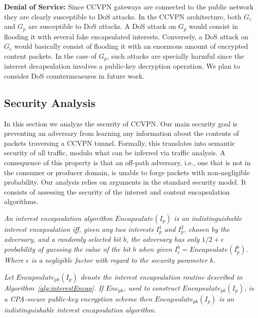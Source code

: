 \textbf{Denial of Service:} Since CCVPN gateways are connected to the public network they are clearly susceptible to DoS attacks. In the CCVPN architecture, both $G_c$ and $G_p$ are susceptible to DoS attacks. A DoS attack on $G_p$ would consist in flooding it with several fake encapsulated interests. Conversely, a DoS attack on $G_c$ would basically consist of flooding it with an enormous amount of encrypted content packets. In the case of $G_p$, such attacks are specially harmful since the interest decapsulation involves a public-key decryption operation. We plan to consider DoS countermeasures in future work.

\subsection{Security Analysis}

In this section we analyze the security of CCVPN. Our main security goal is
preventing an adversary from learning any information about the contents of
packets traversing a CCVPN tunnel. Formally, this translates into semantic
security of all traffic, modulo what can be inferred via traffic analysis.
A consequence of this property is that an off-path adversary, i.e., one that is
not in the consumer or producer domain, is unable to forge packets with
non-negligible probability. Our analysis relies on arguments in the standard
security model. It consists of assessing the security of the interest and
content encapsulation algorithms.

\begin{definition}\label{def1}
\textit{
An interest encapsulation algorithm $Encapsulate(I_p)$ is an indistinguishable interest encapsulation iff, given any two interests $I_p^1$ and $I_p^2$, chosen by the adversary, and a randomly selected bit $b$, the adversary has only $1/2 + \epsilon$ probability of guessing the value of the bit $b$ when given $I_e^b = Encapsulate(I_p^b)$. Where $\epsilon$ is a negligible factor with regard to the security parameter $k$.
}
\end{definition}

\begin{theorem}\label{theo1}
\textit{
Let $Encapsulate_{pk}(I_p)$ denote the interest encapsulation routine described in Algorithm~\ref{alg:interestEncap}. If $Enc_{pk}$, used to construct $Encapsulate_{pk}(I_p)$, is a CPA-secure public-key encryption scheme then $Encapsulate_{pk}(I_p)$ is an indistinguishable interest encapsulation algorithm.
}
\end{theorem}

